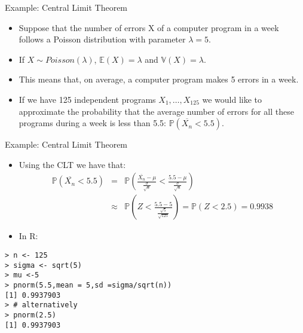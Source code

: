 \documentclass[handout]{beamer}
\begin{document}
\begin{frame}[fragile]{Example: Central Limit Theorem }
\scriptsize{
\begin{itemize}
 \item Suppose that the number of errors X of a computer program in a week follows a Poisson distribution with parameter $\lambda=5$.
 \item If $X \sim Poisson(\lambda)$, $\mathbb{E}(X)=\lambda$ and $\mathbb{V}(X)=\lambda$.
 \item This means that, on average, a computer program makes 5 errors in a week.
 
 \item If we have 125 independent programs $X_{1},\dots,X_{125}$ we would like to approximate the probability that the average number of errors for all these programs during a week is less than 5.5:  $\mathbb{P}(\overline{X_{n}} < 5.5)$.



\end{itemize}






}
 
\end{frame}


\begin{frame}[fragile]{Example: Central Limit Theorem }
\scriptsize{
\begin{itemize}
 \item Using the CLT we have that:
 \begin{eqnarray*}
 \mathbb{P}(\overline{X_{n}} < 5.5) & = & \mathbb{P} \left( \frac{\overline{X_{n}}-\mu}{\frac{\sigma}{\sqrt{n}}} <  \frac{5.5 -\mu}{\frac{\sigma}{\sqrt{n}}}  \right) \nonumber \\ 
                                    & \approx & \mathbb{P}\left( Z < \frac{5.5 - 5}{\frac{\sqrt{5}}{\sqrt{125}}}  \right) = \mathbb{P}( Z < 2.5) =0.9938
\end{eqnarray*}

\item In R:

\end{itemize}

\begin{verbatim}
> n <- 125
> sigma <- sqrt(5)
> mu <-5
> pnorm(5.5,mean = 5,sd =sigma/sqrt(n))
[1] 0.9937903
> # alternatively
> pnorm(2.5)
[1] 0.9937903 
\end{verbatim}




}
 
\end{frame}
\end{document}
